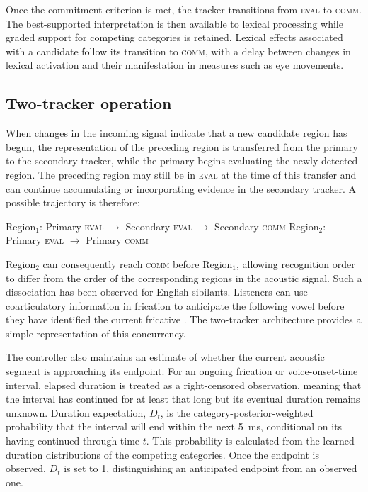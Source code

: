 \documentclass[12pt]{article}
\begin{document}
Once the commitment criterion is met, the tracker transitions from \textsc{eval} to \textsc{comm}.
%
The best-supported interpretation is then available to lexical processing while graded support for competing categories is retained.
%
Lexical effects associated with a candidate follow its transition to \textsc{comm}, with a delay between changes in lexical activation and their manifestation in measures such as eye movements.

\subsection{Two-tracker operation}

When changes in the incoming signal indicate that a new candidate region has begun, the representation of the preceding region is transferred from the primary to the secondary tracker, while the primary begins evaluating the newly detected region.
%
The preceding region may still be in \textsc{eval} at the time of this transfer and can continue accumulating or incorporating evidence in the secondary tracker.
%
A possible trajectory is therefore:

\begin{exe}
\ex Region$_1$: Primary \textsc{eval} $\rightarrow$ Secondary \textsc{eval} $\rightarrow$ Secondary \textsc{comm}
\ex Region$_2$: Primary \textsc{eval} $\rightarrow$ Primary \textsc{comm}
\end{exe}

Region$_2$ can consequently reach \textsc{comm} before Region$_1$, allowing recognition order to differ from the order of the corresponding regions in the acoustic signal.
%
Such a dissociation has been observed for English sibilants. Listeners can use coarticulatory information in frication to anticipate the following vowel before they have identified the current fricative \citep{SchreiberMcMurray2019}.
%
The two-tracker architecture provides a simple representation of this concurrency.

The controller also maintains an estimate of whether the current acoustic segment is approaching its endpoint.
%
For an ongoing frication or voice-onset-time interval, elapsed duration is treated as a right-censored observation, meaning that the interval has continued for at least that long but its eventual duration remains unknown.
%
Duration expectation, $D_t$, is the category-posterior-weighted probability that the interval will end within the next 5~ms, conditional on its having continued through time $t$.
%
This probability is calculated from the learned duration distributions of the competing categories.
%
Once the endpoint is observed, $D_t$ is set to 1, distinguishing an anticipated endpoint from an observed one.
\end{document}

